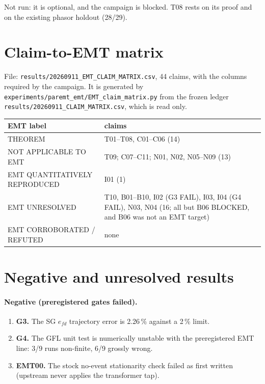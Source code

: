 \documentclass[10pt,a4paper]{article}
\newcommand{\f}[1]{\nolinkurl{#1}}
\begin{document}
Not run: it is optional, and the campaign is blocked. T08 rests on its proof
and on the existing phasor holdout (28/29).

\section{Claim-to-EMT matrix}

File: \f{results/20260911_EMT_CLAIM_MATRIX.csv}, 44 claims, with the columns
required by the campaign. It is generated by
\f{experiments/paremt_emt/EMT_claim_matrix.py} from the frozen ledger
\f{results/20260911_CLAIM_MATRIX.csv}, which is read only.

\medskip
\noindent\begin{tabularx}{\linewidth}{@{}L{5.0cm}Y@{}}
\toprule
EMT label & claims\\
\midrule
THEOREM & T01--T08, C01--C06 (14)\\
NOT APPLICABLE TO EMT & T09; C07--C11; N01, N02, N05--N09 (13)\\
EMT QUANTITATIVELY REPRODUCED & I01 (1)\\
EMT UNRESOLVED & T10, B01--B10, I02 (G3 FAIL), I03, I04 (G4 FAIL), N03, N04 (16; all but B06 BLOCKED, and B06 was not an EMT target)\\
EMT CORROBORATED / REFUTED & none\\
\bottomrule
\end{tabularx}

\section{Negative and unresolved results}

\paragraph{Negative (preregistered gates failed).}
\begin{enumerate}
\item \textbf{G3.} The SG $e_{fd}$ trajectory error is 2.26\,\% against a
  2\,\% limit.
\item \textbf{G4.} The GFL unit test is numerically unstable with the
  preregistered EMT line: 3/9 runs non-finite, 6/9 grossly wrong.
\item \textbf{EMT00.} The stock no-event stationarity check failed as first
  written (upstream never applies the transformer tap).
\end{enumerate}
\end{document}
